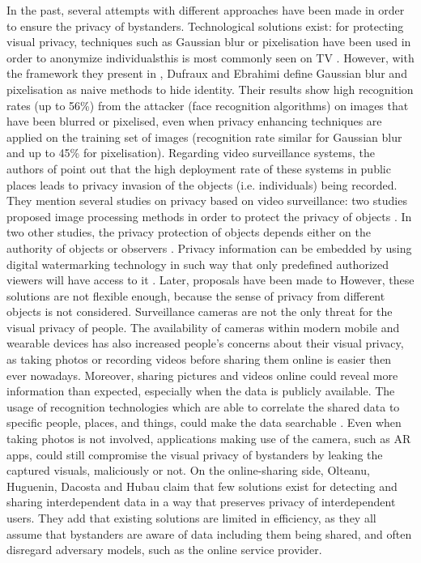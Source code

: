 \documentclass[conference]{IEEEtran}
\begin{document}
In the past, several attempts with different approaches have been made in order to ensure the privacy of bystanders. Technological solutions exist: for protecting visual privacy, techniques such as Gaussian blur or pixelisation have been used in order to anonymize individuals\textemdash this is most commonly seen on TV \cite{dufaux2010framework}. However, with the framework they present in \cite{dufaux2010framework}, Dufraux and Ebrahimi define Gaussian blur and pixelisation as naive methods to hide identity. Their results show high recognition rates (up to 56\%) from the attacker (face recognition algorithms) on images that have been blurred or pixelised, even when privacy enhancing techniques are applied on the training set of images (recognition rate similar for Gaussian blur and up to 45\% for pixelisation). 
Regarding video surveillance systems, the authors of \cite{chinomi2008PriSurv} point out that the high deployment rate of these systems in public places leads to privacy invasion of the objects (i.e. individuals) being recorded. They mention several studies on privacy based on video surveillance: two studies proposed image processing methods in order to protect the privacy of objects \cite{cavallaro2005, kitahara2004}. In two other studies, the privacy protection of objects depends either on the authority of objects or observers \cite{jehan2005, senior2005}. Privacy information can be embedded by using digital watermarking technology in such way that only predefined authorized viewers will have access to it \cite{zhang2005}. Later, proposals have been made to However, these solutions are not flexible enough, because the sense of privacy from different objects is not considered.
Surveillance cameras are not the only threat for the visual privacy of people. The availability of cameras within modern mobile and wearable devices has also increased people's concerns about their visual privacy, as taking photos or recording videos before sharing them online is easier then ever nowadays. Moreover, sharing pictures and videos online could reveal more information than expected, especially when the data is publicly available. The usage of recognition technologies which are able to correlate the shared data to specific people, places, and things, could make the data searchable \cite{gross2014, shaw2006}. Even when taking photos is not involved, applications making use of the camera, such as \ac{AR} apps, could still compromise the visual privacy of bystanders by leaking the captured visuals, maliciously or not.  
On the online-sharing side, Olteanu, Huguenin, Dacosta and Hubau \cite{olteanu2018consensual} claim that few solutions exist for detecting and sharing interdependent data in a way that preserves privacy of interdependent users. They add that existing solutions are limited in efficiency, as they all assume that bystanders are aware of data including them being shared, and often disregard adversary models, such as the online service provider. 
\end{document}
